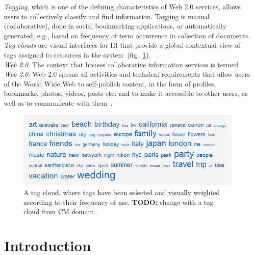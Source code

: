 \textit{Tagging}, which is one of the defining characteristics of Web 2.0 services, allows users to collectively classify and find information. Tagging is manual (collaborative), done in social bookmarking applications, or automatically generated, e.g., based on frequency of term occurrence in collection of documents.\\

\textit{Tag clouds} are visual interfaces for \gls{IR} that provide a global contextual view of tags assigned to resources in the system~(fig.~\ref{fig:tagcloud}). \\


\textit{Web 2.0}. The context that houses collaborative information services is termed \textit{Web 2.0}. Web 2.0 spsans all activities and technical requirements that allow users of the World Wide Web to self-publish content, in the form of profiles, bookmarks, photos, videos, posts etc. and to make it accessible to other users, as well as to communicate with them~\cite{folksonomiesWeb2.0_2009}. \\


%
%
\begin{figure}[htbp]
	\centering
	\includegraphics[width=\ScaleIfNeeded]{img/tagcloud} 
	\caption[A tag cloud.]{A tag cloud, where tags have been selected and visually weighted according to their frequency of use. \textbf{TODO:} change with a tag cloud from CM domain. }
	\label{fig:tagcloud}
\end{figure}

\section{Introduction}

